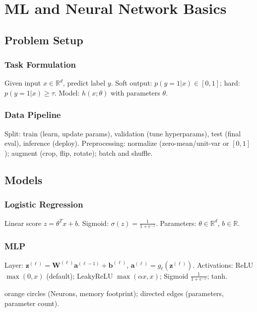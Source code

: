 \section{ML and Neural Network Basics}
\subsection{Problem Setup}
\subsubsection*{Task Formulation}
Given input $x\in\mathbb{R}^d$, predict label $y$. Soft output: $p(y=1|x)\in[0,1]$; hard: $p(y=1|x)\ge\tau$.
Model: $h(x;\theta)$ with parameters $\theta$.

\subsubsection*{Data Pipeline}
Split: train (learn, update params), validation (tune hyperparams), test (final eval), inference (deploy).
Preprocessing: normalize (zero-mean/unit-var or $[0,1]$); augment (crop, flip, rotate); batch and shuffle.

\subsection{Models}
\subsubsection*{Logistic Regression}
Linear score $z=\theta^Tx+b$. Sigmoid: $\sigma(z)=\frac{1}{1+e^{-z}}$.
Parameters: $\theta\in\mathbb{R}^d$, $b\in\mathbb{R}$.

\subsubsection*{MLP}
Layer: $\mathbf{z}^{(\ell)}=\mathbf{W}^{(\ell)}\mathbf{a}^{(\ell-1)}+\mathbf{b}^{(\ell)}$, $\mathbf{a}^{(\ell)}=g_\ell(\mathbf{z}^{(\ell)})$.
Activations: ReLU $\max(0,x)$ (default); LeakyReLU $\max(\alpha x,x)$; Sigmoid $\frac{1}{1+e^{-x}}$; tanh.



orange circles (Neurons, memory footprint); directed edges (parameters, parameter count).

